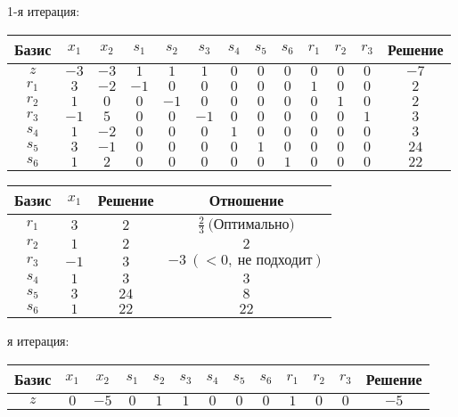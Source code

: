 \documentclass{article}%
\begin{document}
\begin{flushleft}%
1{-}я итерация: %
\newline%
\newline%
\renewcommand{\arraystretch}{1.3}%
\begin{tabular}{|c|ccccccccccc|c|}%
\hline%
Базис&$x_{1}$&$x_{2}$&$s_{1}$&$s_{2}$&$s_{3}$&$s_{4}$&$s_{5}$&$s_{6}$&$r_{1}$&$r_{2}$&$r_{3}$&Решение\\%
\hline%
$z$&$-3$&$-3$&$1$&$1$&$1$&$0$&$0$&$0$&$0$&$0$&$0$&$-7$\\%
\hline%
$r_{1}$&$3$&$-2$&$-1$&$0$&$0$&$0$&$0$&$0$&$1$&$0$&$0$&$2$\\%
$r_{2}$&$1$&$0$&$0$&$-1$&$0$&$0$&$0$&$0$&$0$&$1$&$0$&$2$\\%
$r_{3}$&$-1$&$5$&$0$&$0$&$-1$&$0$&$0$&$0$&$0$&$0$&$1$&$3$\\%
$s_{4}$&$1$&$-2$&$0$&$0$&$0$&$1$&$0$&$0$&$0$&$0$&$0$&$3$\\%
$s_{5}$&$3$&$-1$&$0$&$0$&$0$&$0$&$1$&$0$&$0$&$0$&$0$&$24$\\%
$s_{6}$&$1$&$2$&$0$&$0$&$0$&$0$&$0$&$1$&$0$&$0$&$0$&$22$\\%
\hline%
\end{tabular}%
\newline%
\newline%
\newline%
\begin{tabular}{|cccc|}%
\hline%
Базис&$x_{1}$&Решение&Отношение\\%
\hline%
$r_{1}$&$3$&$2$&$\frac{2}{3}\: \text{(Оптимально)}$\\%
$r_{2}$&$1$&$2$&$2$\\%
$r_{3}$&$-1$&$3$&$-3\: (< 0, \: \text{не подходит})$\\%
$s_{4}$&$1$&$3$&$3$\\%
$s_{5}$&$3$&$24$&$8$\\%
$s_{6}$&$1$&$22$&$22$\\%
\hline%
\end{tabular}%
\newline%
\newline%
я итерация: %
\newline%
\newline%
\renewcommand{\arraystretch}{1.3}%
\begin{tabular}{|c|ccccccccccc|c|}%
\hline%
Базис&$x_{1}$&$x_{2}$&$s_{1}$&$s_{2}$&$s_{3}$&$s_{4}$&$s_{5}$&$s_{6}$&$r_{1}$&$r_{2}$&$r_{3}$&Решение\\%
\hline%
$z$&$0$&$-5$&$0$&$1$&$1$&$0$&$0$&$0$&$1$&$0$&$0$&$-5$\\%

\end{tabular}
\end{flushleft}
\end{document}
